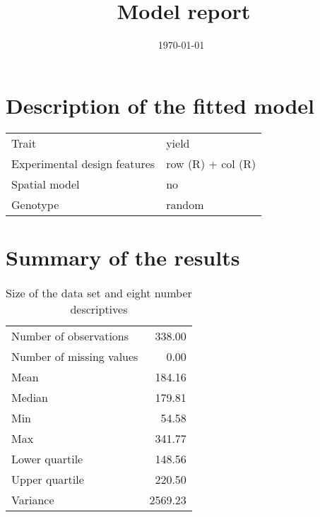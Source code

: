\documentclass[a4paper,11pt]{article}\usepackage[]{graphicx}\usepackage[]{color}
\title{Model report}%
\author{\vspace{-5ex}}
\date{\today\ \currenttime} %
\begin{document}



\maketitle

\singlespacing

\section{Description of the fitted model}

\begin{table}[ht]
\begin{flushleft}
\begin{tabular}{ll}
  Trait & yield \\ 
  Experimental design features & row (R) + col (R) \\ 
  Spatial model & no \\ 
  Genotype & random \\ 
  \end{tabular}
\label{modelDescription}
\end{flushleft}
\end{table}


\section{Summary of the results}

\begin{table}[ht]
\begin{flushleft}
\caption{Size of the data set and eight number descriptives} 
\label{modelSummary}
\begin{tabular}{lr}
  \hline
  \hline
Number of observations & 338.00 \\ 
  Number of missing values & 0.00 \\ 
  Mean & 184.16 \\ 
  Median & 179.81 \\ 
  Min & 54.58 \\ 
  Max & 341.77 \\ 
  Lower quartile & 148.56 \\ 
  Upper quartile & 220.50 \\ 
  Variance & 2569.23 \\ 
   \hline
\end{tabular}
\end{flushleft}
\end{table}
\end{document}
